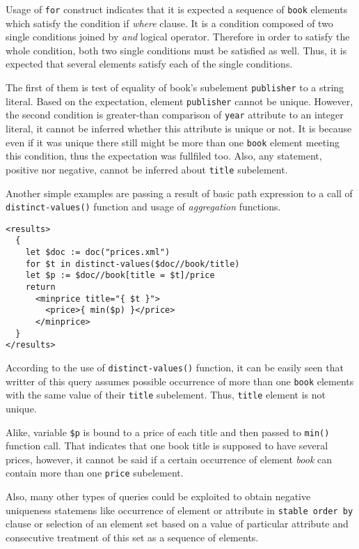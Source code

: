 Usage of \texttt{for} construct indicates that it is expected a sequence of \texttt{book} elements which satisfy the condition if \emph{where} clause. It is a condition composed of two single conditions joined by \emph{and} logical operator. Therefore in order to satisfy the whole condition, both two single conditions must be satisfied as well. Thus, it is expected that several elements satisfy each of the single conditions.

The first of them is test of equality of book's subelement \texttt{publisher} to a string literal. Based on the expectation, element \texttt{publisher} cannot be unique. However, the second condition is greater-than comparison of \texttt{year} attribute to an integer literal, it cannot be inferred whether this attribute is unique or not. It is because even if it was unique there still might be more than one \texttt{book} element meeting this condition, thus the expectation was fullfiled too. Also, any statement, positive nor negative, cannot be inferred about \texttt{title} subelement.

Another simple examples are passing a result of basic path expression to a call of \texttt{distinct-values()} function and usage of \emph{aggregation} functions.

\begin{verbatim}
<results>
  {
    let $doc := doc("prices.xml")
    for $t in distinct-values($doc//book/title)
    let $p := $doc//book[title = $t]/price
    return
      <minprice title="{ $t }">
        <price>{ min($p) }</price>
      </minprice>
  }
</results>
\end{verbatim}

According to the use of \texttt{distinct-values()} function, it can be easily seen that writter of this query assumes possible occurrence of more than one \texttt{book} elements with the same value of their \texttt{title} subelement. Thus, \texttt{title} element is not unique.

Alike, variable \texttt{\$p} is bound to a price of each title and then passed to \texttt{min()} function call. That indicates that one book title is supposed to have several prices, however, it cannot be said if a certain occurrence of element \emph{book} can contain more than one \texttt{price} subelement.

Also, many other types of queries could be exploited to obtain negative uniqueness statemens like occurrence of element or attribute in \texttt{stable order by} clause or selection of an element set based on a value of particular attribute and consecutive treatment of this set as a sequence of elements.

